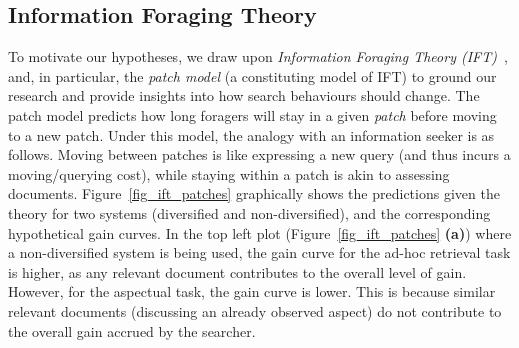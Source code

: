 \subsection{Information Foraging Theory} \label{sec:ift}


To motivate our hypotheses, we draw upon \emph{Information Foraging Theory (IFT)}~\cite{pirolli1999ift}, and, in particular, the \textit{patch model} (a constituting model of IFT) to ground our research and provide insights into how search behaviours should change. %
The patch model predicts how long foragers will stay in a given \emph{patch} before moving to a new patch. Under this model, the analogy with an information seeker is as follows. Moving between patches is like expressing a new query (and thus incurs a moving/querying cost), while staying within a patch is akin to assessing documents. 
Figure~\ref{fig_ift_patches} graphically shows the predictions given the theory for two systems (diversified and non-diversified), and the corresponding hypothetical gain curves. In the top left plot (Figure~\ref{fig_ift_patches} \textbf{(a)}) where a non-diversified system is being used, the gain curve for the ad-hoc retrieval task is higher, as any relevant document contributes to the overall level of gain. However, for the aspectual task, the gain curve is lower. This is because similar relevant documents (discussing an already observed aspect) do not contribute to the overall gain accrued by the searcher.


